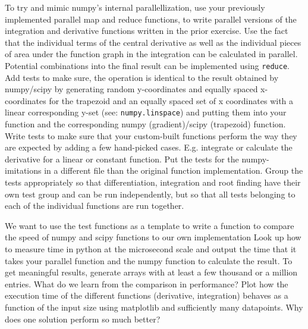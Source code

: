 \documentclass[]{erlangen-problemset}
\begin{document}
\begin{problem}[title={Parallel numpy/scipy replacement}]
\noindent
\Question To try and mimic numpy's internal parallellization, use your previously implemented parallel map and reduce functions, to write parallel versions of the integration and derivative functions written in the prior exercise. 
Use the fact that the individual terms of the central derivative as well as the individual pieces of area under the function graph in the integration can be calculated in parallel. 
Potential combinations into the final result can be implemented using  \texttt{reduce}.
\Question Add tests to make sure, the operation is identical to the result obtained by numpy/scipy by generating random y-coordinates and equally spaced x-coordinates for the trapezoid and an equally spaced set of x coordinates with a linear corresponding y-set (see: \texttt{numpy.linspace}) and putting them into your function and the corresponding numpy (gradient)/scipy (trapezoid) function.
\Question Write tests to make sure that your custom-built functions perform the way they are expected by adding a few hand-picked cases. 
E.g. integrate or calculate the derivative for a linear or constant function.
\Question Put the tests for the numpy-imitations in a different file than the original function implementation.
\Question Group the tests appropriately so that differentiation, integration and root finding have their own test group and can be run independently, but so that all tests belonging to each of the individual functions are run together.
\end{problem}

\begin{problem}[title={Measuring performance}]
We want to use the test functions as a template to write a function to compare the speed of numpy and scipy functions to our own implementation
\noindent
\Question Look up how to measure time in python at the microsecond scale and output the time that it takes your parallel function and the numpy function to calculate the result. To get meaningful results, generate arrays with at least a few thousand or a million entries.
\Question What do we learn from the comparison in performance?
\Question Plot how the execution time of the different functions (derivative, integration) behaves as a function of the input size using matplotlib and sufficiently many datapoints.
\Question Why does one solution perform so much better?
\end{problem}
\end{document}
